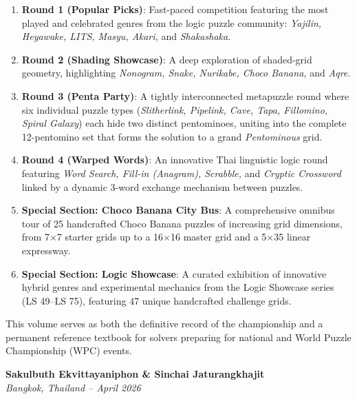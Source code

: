 \documentclass[a4paper, openany, 11pt, twoside]{book}
\begin{document}
\begin{enumerate}
    \item \textbf{Round 1 (Popular Picks)}: Fast-paced competition featuring the most played and celebrated genres from the logic puzzle community: \textit{Yajilin, Heyawake, LITS, Masyu, Akari,} and \textit{Shakashaka}.
    \item \textbf{Round 2 (Shading Showcase)}: A deep exploration of shaded-grid geometry, highlighting \textit{Nonogram, Snake, Nurikabe, Choco Banana,} and \textit{Aqre}.
    \item \textbf{Round 3 (Penta Party)}: A tightly interconnected metapuzzle round where six individual puzzle types (\textit{Slitherlink, Pipelink, Cave, Tapa, Fillomino, Spiral Galaxy}) each hide two distinct pentominoes, uniting into the complete 12-pentomino set that forms the solution to a grand \textit{Pentominous} grid.
    \item \textbf{Round 4 (Warped Words)}: An innovative Thai linguistic logic round featuring \textit{Word Search, Fill-in (Anagram), Scrabble,} and \textit{Cryptic Crossword} linked by a dynamic 3-word exchange mechanism between puzzles.
    \item \textbf{Special Section: Choco Banana City Bus}: A comprehensive omnibus tour of 25 handcrafted Choco Banana puzzles of increasing grid dimensions, from 7$\times$7 starter grids up to a 16$\times$16 master grid and a 5$\times$35 linear expressway.
    \item \textbf{Special Section: Logic Showcase}: A curated exhibition of innovative hybrid genres and experimental mechanics from the Logic Showcase series (LS 49--LS 75), featuring 47 unique handcrafted challenge grids.
\end{enumerate}

This volume serves as both the definitive record of the championship and a permanent reference textbook for solvers preparing for national and World Puzzle Championship (WPC) events.

\bigskip
\begin{flushright}
\textbf{Sakulbuth Ekvittayaniphon \& Sinchai Jaturangkhajit} \\
\textit{Bangkok, Thailand -- April 2026}
\end{flushright}

\newpage

\tableofcontents
\newpage
\end{document}
